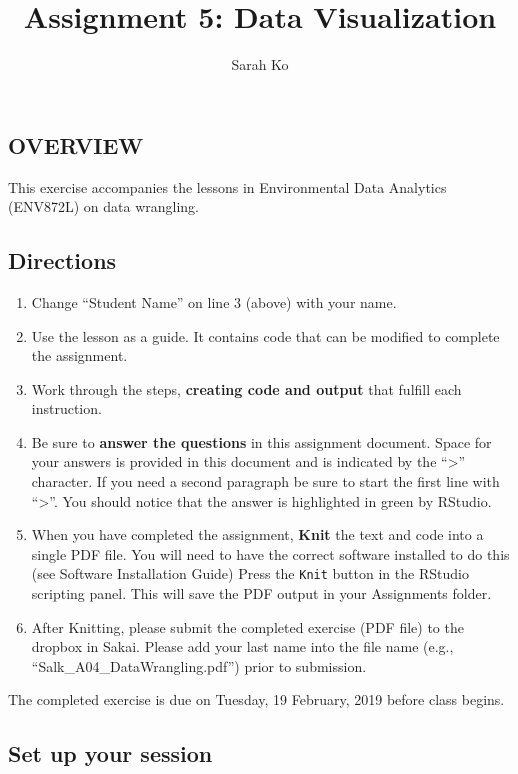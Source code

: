 \documentclass[]{article}
\title{Assignment 5: Data Visualization}
\author{Sarah Ko}
\date{}
\providecommand{\tightlist}{%
  \setlength{\itemsep}{0pt}\setlength{\parskip}{0pt}}
\begin{document}
\maketitle

\subsection{OVERVIEW}\label{overview}

This exercise accompanies the lessons in Environmental Data Analytics
(ENV872L) on data wrangling.

\subsection{Directions}\label{directions}

\begin{enumerate}
\def\labelenumi{\arabic{enumi}.}
\tightlist
\item
  Change ``Student Name'' on line 3 (above) with your name.
\item
  Use the lesson as a guide. It contains code that can be modified to
  complete the assignment.
\item
  Work through the steps, \textbf{creating code and output} that fulfill
  each instruction.
\item
  Be sure to \textbf{answer the questions} in this assignment document.
  Space for your answers is provided in this document and is indicated
  by the ``\textgreater{}'' character. If you need a second paragraph be
  sure to start the first line with ``\textgreater{}''. You should
  notice that the answer is highlighted in green by RStudio.
\item
  When you have completed the assignment, \textbf{Knit} the text and
  code into a single PDF file. You will need to have the correct
  software installed to do this (see Software Installation Guide) Press
  the \texttt{Knit} button in the RStudio scripting panel. This will
  save the PDF output in your Assignments folder.
\item
  After Knitting, please submit the completed exercise (PDF file) to the
  dropbox in Sakai. Please add your last name into the file name (e.g.,
  ``Salk\_A04\_DataWrangling.pdf'') prior to submission.
\end{enumerate}

The completed exercise is due on Tuesday, 19 February, 2019 before class
begins.

\subsection{Set up your session}\label{set-up-your-session}
\end{document}
